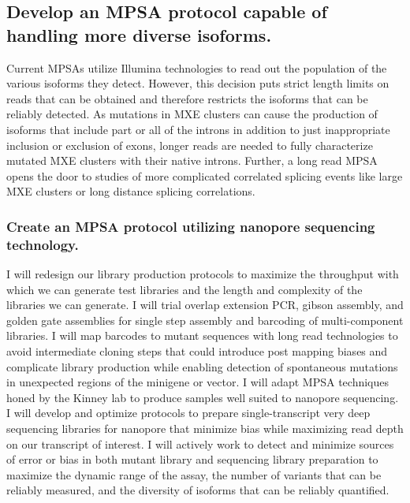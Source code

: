 \documentclass{article}
\begin{document}
\subsection{Develop an MPSA protocol capable of handling more diverse isoforms.} \label{aim:MPSA_dev}
Current MPSAs utilize Illumina technologies to read out the population of the various isoforms they detect.\cite{Ke2018-af, Julien2016-wa, Adamson2018-va, Soemedi2017-pz, Cortes-Lopez2022-gy, Schirman2021-ss, Mikl2019-ng, Braun2018-mb, Soucek2019-iq, Baeza-Centurion2020-tn, Cheung2019-ah, Baeza-Centurion2019-hz, Rosenberg2015-zs, Wong2018-vq} 
However, this decision puts strict length limits on reads that can be obtained and therefore restricts the isoforms that can be reliably detected.
As mutations in MXE clusters can cause the production of isoforms that include part or all of the introns in addition to just inappropriate inclusion or exclusion of exons,\cite{Wang2012-dr} longer reads are needed to fully characterize mutated MXE clusters with their native introns. 
Further, a long read MPSA opens the door to studies of more complicated correlated splicing events like large MXE clusters\cite{Hatje2017-oj} or long distance splicing correlations.\cite{Zhu2021-fs, Tilgner2015-sb, Tilgner2018-jo}
%
\subsubsection{Create an MPSA protocol utilizing nanopore sequencing technology.} \label{aim:nanopore_screen_dev}
I will redesign our library production protocols to maximize the throughput with which we can generate test libraries and the length and complexity of the libraries we can generate.
I will trial overlap extension PCR, gibson assembly, and golden gate assemblies for single step assembly and barcoding of multi-component libraries.
I will map barcodes to mutant sequences with long read technologies to avoid intermediate cloning steps that could introduce post mapping biases and complicate library production while enabling detection of spontaneous mutations in unexpected regions of the minigene or vector.
I will adapt MPSA techniques honed by the Kinney lab \cite{Wong2018-vq,Ishigami2022-bf} to produce samples well suited to nanopore sequencing.
I will develop and optimize protocols to prepare single-transcript very deep sequencing libraries for nanopore that minimize bias while maximizing read depth on our transcript of interest.
I will actively work to detect and minimize sources of error or bias in both mutant library and sequencing library preparation to maximize the dynamic range of the assay, the number of variants that can be reliably measured, and the diversity of isoforms that can be reliably quantified.
%
\end{document}
